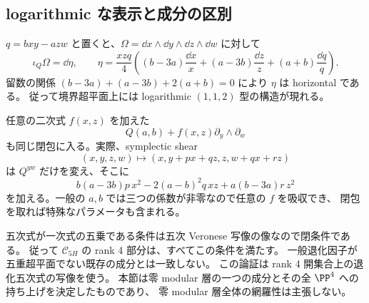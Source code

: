 \subsection{logarithmic な表示と成分の区別}
$q=bxy-azw$ と置くと、$\Omega=\dd x\wedge\dd y\wedge\dd z\wedge\dd w$ に対して
\[
 \iota_Q\Omega=\dd\eta,\qquad
 \eta=\frac{xzq}{4}\left(
 (b-3a)\frac{\dd x}{x}+(a-3b)\frac{\dd z}{z}+(a+b)\frac{\dd q}{q}
 \right).
\]
留数の関係 $(b-3a)+(a-3b)+2(a+b)=0$ により $\eta$ は horizontal である。
従って境界超平面上には logarithmic $(1,1,2)$ 型の構造が現れる。

任意の二次式 $f(x,z)$ を加えた
\[
 Q(a,b)+f(x,z)\partial_y\wedge\partial_w
\]
も同じ閉包に入る。実際、symplectic shear
\[
 (x,y,z,w)\longmapsto(x,y+px+qz,z,w+qx+rz)
\]
は $Q^{yw}$ だけを変え、そこに
\[
 b(a-3b)p\,x^2-2(a-b)^2q\,xz+a(b-3a)r\,z^2
\]
を加える。一般の $a,b$ では三つの係数が非零なので任意の $f$ を吸収でき、
閉包を取れば特殊なパラメータも含まれる。

五次式が一次式の五乗である条件は五次 Veronese 写像の像なので閉条件である。
従って $\mathcal C_{5H}$ の rank 4 部分は、すべてこの条件を満たす。
一般退化因子が五重超平面でない既存の成分とは一致しない。
この論証は rank 4 開集合上の退化五次式の写像を使う。
本節は零 modular 層の一つの成分とその全 $\PP^4$ への持ち上げを決定したものであり、
零 modular 層全体の網羅性は主張しない。
